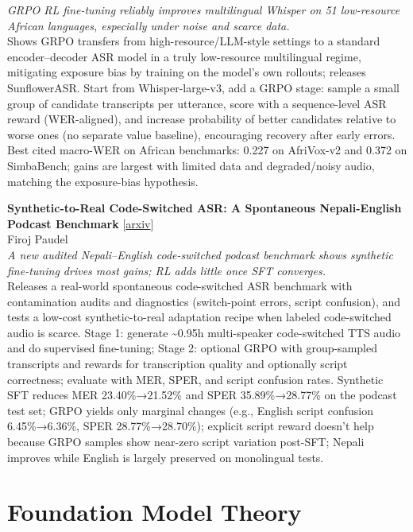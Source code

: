 \documentclass[12pt,letterpaper]{article}
\begin{document}
{\small\textit{GRPO RL fine-tuning reliably improves multilingual Whisper on 51 low-resource African languages, especially under noise and scarce data.}}\\[1pt]
{\footnotesize Shows GRPO transfers from high-resource/LLM-style settings to a standard encoder--decoder ASR model in a truly low-resource multilingual regime, mitigating exposure bias by training on the model's own rollouts; releases SunflowerASR. Start from Whisper-large-v3, add a GRPO stage: sample a small group of candidate transcripts per utterance, score with a sequence-level ASR reward (WER-aligned), and increase probability of better candidates relative to worse ones (no separate value baseline), encouraging recovery after early errors. Best cited macro-WER on African benchmarks: 0.227 on AfriVox-v2 and 0.372 on SimbaBench; gains are largest with limited data and degraded/noisy audio, matching the exposure-bias hypothesis.}

\medskip

{\small\textbf{Synthetic-to-Real Code-Switched ASR: A Spontaneous Nepali-English Podcast Benchmark}} {\scriptsize[\href{https://arxiv.org/abs/2610.30860}{arxiv}]}\\
{\scriptsize Firoj Paudel}\\

{\small\textit{A new audited Nepali--English code-switched podcast benchmark shows synthetic fine-tuning drives most gains; RL adds little once SFT converges.}}\\[1pt]
{\footnotesize Releases a real-world spontaneous code-switched ASR benchmark with contamination audits and diagnostics (switch-point errors, script confusion), and tests a low-cost synthetic-to-real adaptation recipe when labeled code-switched audio is scarce. Stage 1: generate \textasciitilde{}0.95h multi-speaker code-switched TTS audio and do supervised fine-tuning; Stage 2: optional GRPO with group-sampled transcripts and rewards for transcription quality and optionally script correctness; evaluate with MER, SPER, and script confusion rates. Synthetic SFT reduces MER 23.40\%→21.52\% and SPER 35.89\%→28.77\% on the podcast test set; GRPO yields only marginal changes (e.g., English script confusion 6.45\%→6.36\%, SPER 28.77\%→28.70\%); explicit script reward doesn't help because GRPO samples show near-zero script variation post-SFT; Nepali improves while English is largely preserved on monolingual tests.}

\medskip


\section*{Foundation Model Theory}
\end{document}
